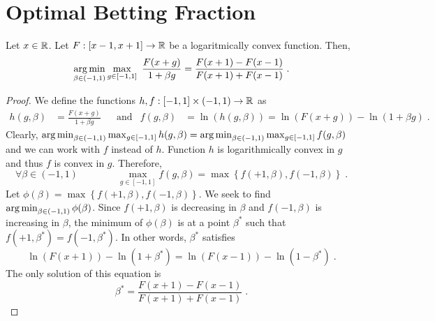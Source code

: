 \section{Optimal Betting Fraction}
\label{section:optimal-betting-fraction}

\begin{theorem}
\label{theorem:optimal-betting-fraction}
Let $x \in \mathbb{R}$. Let $F:[x-1,x+1] \to \mathbb{R}$ be a logaritmically convex function. Then,
\[
\operatorname*{arg\,min}_{\beta \in (-1,1)} \max_{g \in [-1,1]} \ \frac{F(x+g)}{1 + \beta g}
= \frac{F(x+1) - F(x-1)}{F(x+1) + F(x-1)} \; .
\]
\end{theorem}

\begin{proof}
We define the functions $h,f:[-1,1] \times (-1,1) \to \mathbb{R}$ as
\begin{align*}
h(g, \beta) & = \frac{F(x+g)}{1 + \beta g} &
& \text{and} &
f(g, \beta) & = \ln (h(g,\beta)) = \ln(F(x+g)) - \ln(1 + \beta g) \; .
\end{align*}
Clearly, $\operatorname*{arg\,min}_{\beta \in (-1,1)} \max_{g \in [-1,1]} h(g,\beta) = \operatorname*{arg\,min}_{\beta \in (-1,1)} \max_{g \in [-1,1]} f(g,\beta)$
and we can work with $f$ instead of $h$. Function $h$ is logarithmically convex
in $g$ and thus $f$ is convex in $g$. Therefore,
\[
\forall \beta \in (-1,1) \qquad \qquad
\max_{g \in [-1,1]} f(g,\beta) = \max \left\{ f(+1,\beta), f(-1,\beta) \right\} \; .
\]
Let $\phi(\beta) = \max \left\{ f(+1,\beta), f(-1,\beta) \right\}$. We seek to
find $\operatorname*{arg\,min}_{\beta \in (-1,1)} \phi(\beta)$. Since $f(+1,\beta)$ is decreasing
in $\beta$ and $f(-1,\beta)$ is increasing in $\beta$, the minimum of
$\phi(\beta)$ is at a point $\beta^*$ such that $f(+1,\beta^*) = f(-1,\beta^*)$.
In other words, $\beta^*$ satisfies
\[
\ln(F(x+1)) - \ln(1 + \beta^*) =  \ln(F(x-1)) - \ln(1 - \beta^*) \; .
\]
The only solution of this equation is
\[
\beta^* = \frac{F(x+1) - F(x-1)}{F(x+1) + F(x-1)} \; .
\]
\end{proof}
